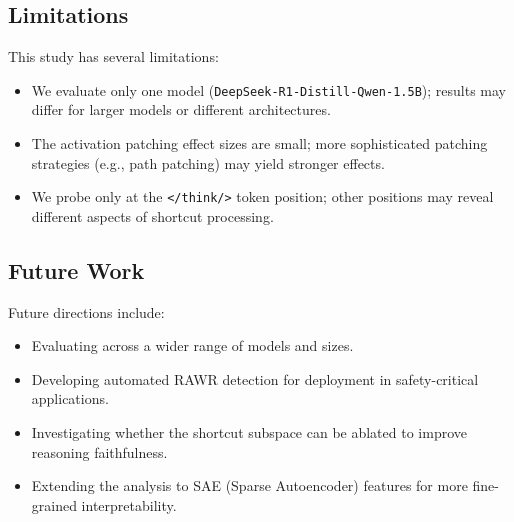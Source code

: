 \subsection{Limitations}
This study has several limitations:
\begin{itemize}
    \item We evaluate only one model (\texttt{DeepSeek-R1-Distill-Qwen-1.5B}); results may differ for larger models or different architectures.
    \item The activation patching effect sizes are small; more sophisticated patching strategies (e.g., path patching) may yield stronger effects.
    \item We probe only at the \texttt{</think/>} token position; other positions may reveal different aspects of shortcut processing.
\end{itemize}

\subsection{Future Work}
Future directions include:
\begin{itemize}
    \item Evaluating across a wider range of models and sizes.
    \item Developing automated RAWR detection for deployment in safety-critical applications.
    \item Investigating whether the shortcut subspace can be ablated to improve reasoning faithfulness.
    \item Extending the analysis to SAE (Sparse Autoencoder) features for more fine-grained interpretability.
\end{itemize}
